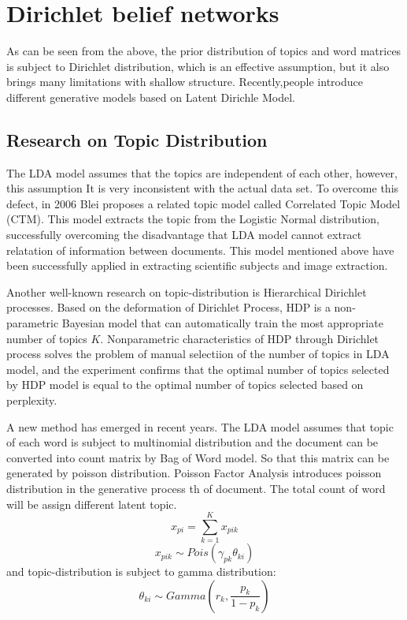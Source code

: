 \section{Dirichlet belief networks}
As can be seen from the above, the prior distribution of topics and word matrices is subject to Dirichlet distribution, which is an effective assumption, but it also brings many limitations with shallow structure. Recently,people introduce different generative models based on Latent Dirichle Model.
\subsection{Research on Topic Distribution}

The LDA model assumes that the topics are independent of each other, however, this assumption
It is very inconsistent with the actual data set. To overcome this defect, in 2006 Blei proposes a related topic model called Correlated Topic Model (CTM)\cite{corr}. This model extracts the topic from the Logistic Normal distribution, successfully overcoming the disadvantage that LDA model cannot extract relatation of  information between documents. This model mentioned
above have been successfully applied in extracting scientific subjects and image extraction.

Another well-known research on topic-distribution is Hierarchical Dirichlet processes\cite{Teh}. Based on the deformation of Dirichlet Process, HDP is a non-parametric Bayesian model that can automatically train the most appropriate number of topics $K$. Nonparametric characteristics of HDP through Dirichlet process solves the problem of manual selectiion of the number of topics in LDA model, and the experiment confirms  that the optimal number of topics selected by HDP model is equal to the optimal number of topics selected based on perplexity.

A new method has emerged in recent years. The LDA model assumes that topic of each word is subject to multinomial distribution and the document can be converted into count matrix by Bag of Word model. So that this matrix can be generated by poisson distribution. Poisson Factor Analysis \cite{han}  introduces poisson distribution in the generative process th of document. The total count of word will be assign different latent topic.
\[
  x_{pi} = \sum_{k=1}^{K} x_{pik}
\]
\[
  x_{pik} \sim Pois(\gamma_{pk}\theta_{ki})
\]
and topic-distribution is subject to gamma distribution:
\[
  \theta_{ki} \sim Gamma(r_k,\frac{p_k}{1-p_k})
\]

